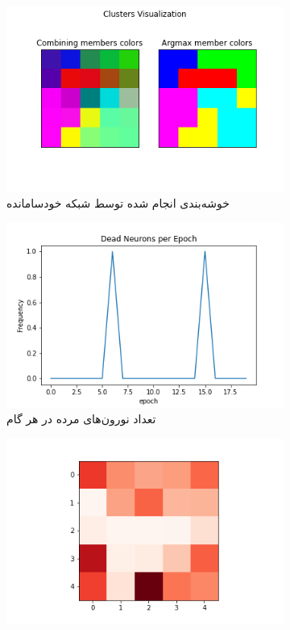 \documentclass[12pt, a4paper]{article}
\begin{document}
\clearpage

\begin{figure}[h]
    \begin{subfigure}{\linewidth}
        \centering
        \includegraphics[width=0.8\linewidth]{images/q5/r2/cluster.png}
        \caption{خوشه‌بندی انجام شده توسط شبکه خودسامانده}
    \end{subfigure}
    \newline
    \begin{subfigure}{0.45\linewidth}
        \includegraphics[width=\linewidth]{images/q5/r2/dead.png}
        \caption{تعداد نورون‌های مرده در هر گام}
    \end{subfigure}
    \hfill
    \begin{subfigure}{0.45\linewidth}
        \includegraphics[width=\linewidth]{images/q5/r2/umatrix.png}

\end{subfigure}
\end{figure}
\end{document}
